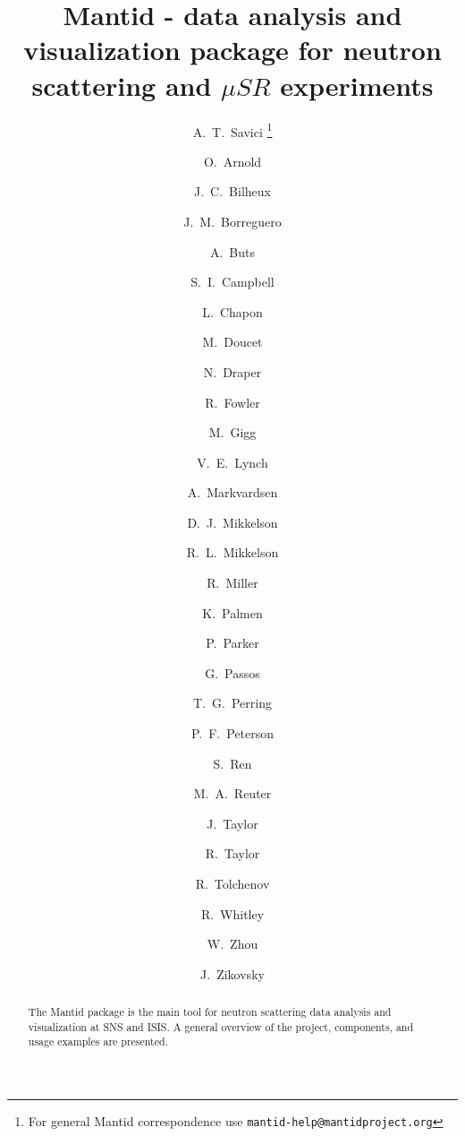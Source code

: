 \documentclass{elsarticle}
\begin{document}
\begin{frontmatter}



\title{Mantid - data analysis and visualization package for neutron scattering and $\mu SR$ experiments}

\author[ornl]{A.~T.~Savici \footnote{For general Mantid correspondence use \texttt{mantid-help@mantidproject.org}}}
\author[tessellaUK]{O.~Arnold}
\author[ornl]{J.~C.~Bilheux}
\author[ornl]{J.~M.~Borreguero}
\author[isis]{A.~Buts}
\author[ornl]{S.~I.~Campbell}
\author[ill]{L.~Chapon}
\author[ornl]{M.~Doucet}
\author[tessellaUK]{N.~Draper}
\author[isis]{R.~Fowler}
\author[tessellaUK]{M.~Gigg}
\author[ornl]{V.~E.~Lynch}
\author[isis]{A.~Markvardsen}
\author[uws,ornl]{D.~J.~Mikkelson}
\author[uws,ornl]{R.~L.~Mikkelson}
\author[ornl]{R.~Miller}
\author[isis]{K.~Palmen}
\author[isis]{P.~Parker}
\author[isis]{G.~Passos}
\author[isis]{T.~G.~Perring}
\author[ornl]{P.~F.~Peterson}
\author[ornl]{S.~Ren}
\author[ornl]{M.~A.~Reuter}
\author[isis]{J.~Taylor}
\author[tessellaUS]{R.~Taylor}
\author[tessellaUK]{R.~Tolchenov}
\author[isis]{R.~Whitley}
\author[ornl]{W.~Zhou}
\author[ornl]{J.~Zikovsky}

\address[ornl]{Neutron Data Analysis and Visualization, Oak Ridge National Laboratory, Oak~Ridge,~TN,~USA}
\address[tessellaUK]{Tessella Ltd., Abingdon, Oxfordshire, UK}
\address[isis]{ISIS Facility, Rutherford Appleton Laboratory, Chilton, Didcot, Oxfordshire, UK}
\address[ill]{Institut Laue-Langevin, Grenoble, France}
\address[uws]{University of Wisconsin-Stout, Menomonie, WI, USA}
\address[tessellaUS]{Tessella Inc., Newton, MA, USA}



\begin{abstract}
The Mantid  package is the main tool for neutron scattering data analysis and visualization at SNS and ISIS. A general overview of the project, components, and usage examples are presented. 
\end{abstract}


\end{frontmatter}
\end{document}
